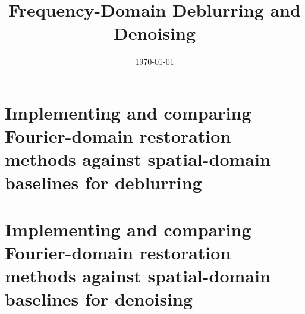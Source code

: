 \documentclass[11pt]{article}
\title{Frequency-Domain Deblurring and Denoising}
\date{\today}
\begin{document}
\maketitle

\newpage

\section*{Implementing and comparing Fourier-domain restoration methods against spatial-domain baselines for deblurring}

\newpage

\section*{Implementing and comparing Fourier-domain restoration methods against spatial-domain baselines for denoising}
\end{document}
